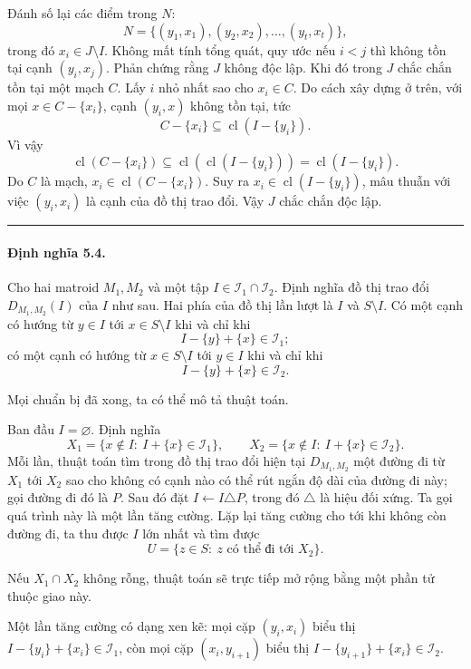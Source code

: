 \documentclass[11pt]{article}
\newcommand{\qedmark}{\hfill\rule{0.7ex}{0.7ex}}
\begin{document}
Đánh số lại các điểm trong \(N\):
\[
  N=\{(y_1,x_1),(y_2,x_2),\ldots,(y_t,x_t)\},
\]
trong đó \(x_i\in J\setminus I\). Không mất tính tổng quát, quy ước nếu
\(i<j\) thì không tồn tại cạnh \((y_i,x_j)\). Phản chứng rằng \(J\) không độc
lập. Khi đó trong \(J\) chắc chắn tồn tại một mạch \(C\). Lấy \(i\) nhỏ nhất
sao cho \(x_i\in C\). Do cách xây dựng ở trên, với mọi \(x\in C-\{x_i\}\), cạnh
\((y_i,x)\) không tồn tại, tức
\[
  C-\{x_i\}\subseteq\operatorname{cl}(I-\{y_i\}).
\]
Vì vậy
\[
  \operatorname{cl}(C-\{x_i\})
  \subseteq \operatorname{cl}(\operatorname{cl}(I-\{y_i\}))
  =\operatorname{cl}(I-\{y_i\}).
\]
Do \(C\) là mạch, \(x_i\in\operatorname{cl}(C-\{x_i\})\). Suy ra
\(x_i\in\operatorname{cl}(I-\{y_i\})\), mâu thuẫn với việc \((y_i,x_i)\) là cạnh
của đồ thị trao đổi. Vậy \(J\) chắc chắn độc lập. \qedmark

\paragraph{Định nghĩa 5.4.}
Cho hai matroid \(M_1,M_2\) và một tập \(I\in\mathcal I_1\cap\mathcal I_2\).
Định nghĩa đồ thị trao đổi \(D_{M_1,M_2}(I)\) của \(I\) như sau. Hai phía của
đồ thị lần lượt là \(I\) và \(S\setminus I\). Có một cạnh có hướng từ
\(y\in I\) tới \(x\in S\setminus I\) khi và chỉ khi
\[
  I-\{y\}+\{x\}\in\mathcal I_1;
\]
có một cạnh có hướng từ \(x\in S\setminus I\) tới \(y\in I\) khi và chỉ khi
\[
  I-\{y\}+\{x\}\in\mathcal I_2.
\]

Mọi chuẩn bị đã xong, ta có thể mô tả thuật toán.

Ban đầu \(I=\varnothing\). Định nghĩa
\[
  X_1=\{x\notin I:\ I+\{x\}\in\mathcal I_1\},\qquad
  X_2=\{x\notin I:\ I+\{x\}\in\mathcal I_2\}.
\]
Mỗi lần, thuật toán tìm trong đồ thị trao đổi hiện tại \(D_{M_1,M_2}\) một đường
đi từ \(X_1\) tới \(X_2\) sao cho không có cạnh nào có thể rút ngắn độ dài của
đường đi này; gọi đường đi đó là \(P\). Sau đó đặt \(I\leftarrow I\triangle P\),
trong đó \(\triangle\) là hiệu đối xứng. Ta gọi quá trình này là một lần tăng
cường. Lặp lại tăng cường cho tới khi không còn đường đi, ta thu được \(I\) lớn
nhất và tìm được
\[
  U=\{z\in S:\ z\text{ có thể đi tới }X_2\}.
\]

Nếu \(X_1\cap X_2\) không rỗng, thuật toán sẽ trực tiếp mở rộng bằng một phần tử
thuộc giao này.

Một lần tăng cường có dạng xen kẽ: mọi cặp \((y_i,x_i)\) biểu thị
\(I-\{y_i\}+\{x_i\}\in\mathcal I_1\), còn mọi cặp \((x_i,y_{i+1})\) biểu thị
\(I-\{y_{i+1}\}+\{x_i\}\in\mathcal I_2\).
\end{document}
